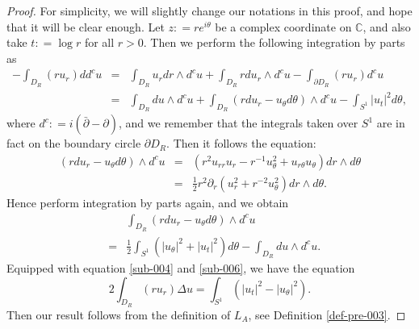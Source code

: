 \documentclass[10pt,a4paper]{amsart}
\def\bC{{\mathbb C}}
\def\dbar{\bar\partial}
\def\d{\partial}
\begin{document}
\begin{proof}
For simplicity, we will slightly change our notations in this proof,  
and hope that it will be clear enough.
Let $z: = r e^{i\theta}$ be a complex coordinate on $\bC$, 
and also take $t: = \log r$ for all $r>0$. 
Then we perform the following integration by parts as 
\begin{eqnarray}
\label{sub-004}
 - \int_{D_R} ( ru_r ) dd^c u 
&=&  \int_{D_R} u_r dr\wedge d^c u + \int_{D_R} r d u_r \wedge d^c u -  \int_{\d D_R} (ru_r) d^c u 
\nonumber\\
&=&  \int_{D_R} du \wedge d^c u + \int_{D_R}  ( r d u_r - u_{\theta} d\theta ) \wedge d^c u 
- \int_{S^1} |u_t|^2 d\theta, 
\end{eqnarray}
where $d^c : = i (\dbar - \d)$, 
and we remember that the integrals taken over $S^1$ are in fact on the boundary circle $\d D_R$. 
Then it follows the equation:
\begin{eqnarray}
\label{sub-005}
 ( r d u_r - u_{\theta} d\theta ) \wedge d^c u 
&=&  \left( r^2 u_{rr} u_r - r^{-1} u^2_{\theta} + u_{r\theta} u_{\theta} \right) dr\wedge d\theta
\nonumber\\
&=& \frac{1}{2}   r^2 \d_r (u_r^2 + r^{-2} u^2_{\theta})  dr \wedge d\theta.
\end{eqnarray}
Hence perform integration by parts again, and we obtain 
\begin{eqnarray}
\label{sub-006}
&&  \int_{D_R} ( r d u_r - u_{\theta} d\theta ) \wedge d^c u 
\nonumber\\
&=&  \frac{1}{2} \int_{S^1} \left( |u_{\theta}|^2 + |u_t|^2  \right) d\theta - \int_{D_R} du \wedge d^c u. 
\end{eqnarray}
Equipped with equation \eqref{sub-004} and \eqref{sub-006}, 
we have the equation 
\begin{equation}
\label{sub-0071}
2\int_{D_R} ( ru_r ) \Delta u
 = \int_{S^1} \left( |u_t|^2 - |u_{\theta}|^2 \right).
\end{equation}
Then our result follows from the definition of $L_A$, see Definition \ref{def-pre-003}. 
\end{proof}
\end{document}

